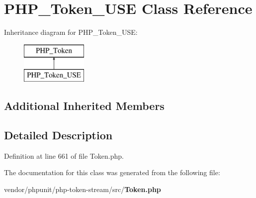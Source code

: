 \section{P\+H\+P\+\_\+\+Token\+\_\+\+U\+S\+E Class Reference}
\label{class_p_h_p___token___u_s_e}
Inheritance diagram for P\+H\+P\+\_\+\+Token\+\_\+\+U\+S\+E\+:\begin{figure}[H]
\begin{center}
\leavevmode
\includegraphics[height=2.000000cm]{class_p_h_p___token___u_s_e}
\end{center}
\end{figure}
\subsection*{Additional Inherited Members}


\subsection{Detailed Description}


Definition at line 661 of file Token.\+php.



The documentation for this class was generated from the following file\+:\begin{DoxyCompactItemize}
\item 
vendor/phpunit/php-\/token-\/stream/src/{\bf Token.\+php}\end{DoxyCompactItemize}
